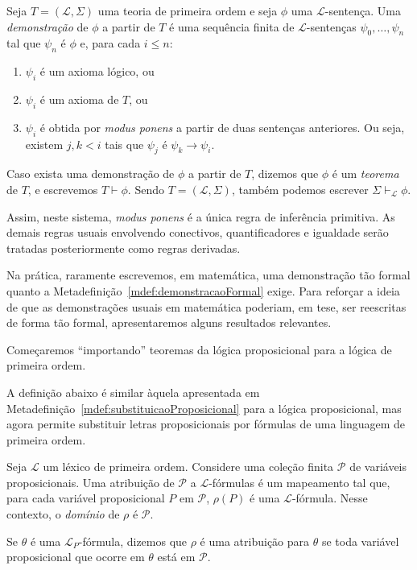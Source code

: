 \begin{metadefinition}[Demonstração]\label{mdef:demonstracaoFormal}
    Seja $T=(\mathcal L,\Sigma)$ uma teoria de primeira ordem e seja $\phi$ uma $\mathcal L$-sentença.
    Uma \emph{demonstração} de $\phi$ a partir de $T$ é uma sequência finita de $\mathcal L$-sentenças $\psi_0, \dots, \psi_n$ tal que $\psi_n$ é $\phi$ e, para cada $i\leq n$:
    \begin{enumerate}[label=(\roman*)]
        \item $\psi_i$ é um axioma lógico, ou
        \item $\psi_i$ é um axioma de $T$, ou
        \item $\psi_i$ é obtida por \emph{modus ponens} a partir de duas sentenças anteriores.
        Ou seja, existem $j, k<i$ tais que $\psi_j$ é  $\psi_k \rightarrow \psi_i$.
    \end{enumerate}

    Caso exista uma demonstração de $\phi$ a partir de $T$, dizemos que $\phi$ é um \emph{teorema} de $T$, e escrevemos $T \vdash \phi$.
    Sendo $T=(\mathcal L, \Sigma)$, também podemos escrever $\Sigma \vdash_\mathcal L \phi$.
\end{metadefinition}

Assim, neste sistema, \emph{modus ponens} é a única regra de inferência primitiva. As demais regras usuais envolvendo conectivos, quantificadores e igualdade serão tratadas posteriormente como regras derivadas.

Na prática, raramente escrevemos, em matemática, uma demonstração tão formal quanto a Metadefinição~\ref{mdef:demonstracaoFormal} exige.
Para reforçar a ideia de que as demonstrações usuais em matemática poderiam, em tese, ser reescritas de forma tão formal, apresentaremos alguns resultados relevantes.

Começaremos ``importando'' teoremas da lógica proposicional para a lógica de primeira ordem.

A definição abaixo é similar àquela apresentada em Metadefinição~\ref{mdef:substituicaoProposicional} para a lógica proposicional, mas agora permite substituir letras proposicionais por fórmulas de uma linguagem de primeira ordem.

\begin{metadefinition}
   Seja $\mathcal L$ um léxico de primeira ordem.
   Considere uma coleção finita $\mathcal P$ de variáveis proposicionais.
   Uma atribuição de $\mathcal P$ a $\mathcal L$-fórmulas é um mapeamento tal que, para cada variável proposicional $P$ em $\mathcal P$, $\rho(P)$ é uma $\mathcal L$-fórmula.
   Nesse contexto, o \emph{domínio} de $\rho$ é $\mathcal P$.

   Se $\theta$ é uma $\mathcal L_P$-fórmula, dizemos que $\rho$ é uma atribuição para $\theta$ se toda variável proposicional que ocorre em $\theta$ está em $\mathcal P$.
\end{metadefinition}

